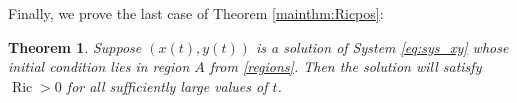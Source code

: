 \documentclass{amsart}
\numberwithin{equation}{section}
\newtheorem{theorem}[equation]{Theorem}
\theoremstyle{plain}
\theoremstyle{definition}
\theoremstyle{remark}
\numberwithin{table}{section}
\DeclareMathOperator{\Ric}{Ric}
\begin{document}


    Finally, we prove the last case of Theorem \ref{mainthm:Ricpos}:
    
    \begin{theorem}\label{thm:enter-P-positive-xy}
        Suppose $(x(t),y(t))$ is a solution of System \eqref{eq:sys_xy} whose initial condition lies in region $A$ from \eqref{regions}.
        Then the solution will satisfy $\Ric>0$ for all sufficiently large values of $t$.
    \end{theorem}
\end{document}
